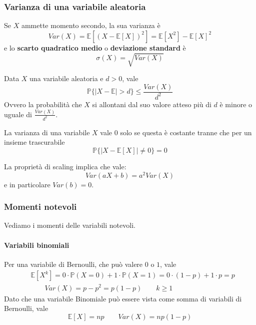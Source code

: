 \subsubsection{Varianza di una variabile aleatoria}
\begin{definition} [Varianza]
	Se $X$ ammette momento secondo, la sua varianza è
	\begin{equation}
		Var(X) = \mathbb{E}[(X-\mathbb{E}[X])^2] = \mathbb{E}[X^2]-\mathbb{E}[X]^2
	\end{equation}
	e lo \textbf{scarto quadratico medio} o \textbf{deviazione standard} è
	\begin{equation}
		\sigma(X) = \sqrt{Var(X)}
	\end{equation}
\end{definition}

\begin{proposition}
	Data $X$ una variabile aleatoria e $d>0$, vale
	\begin{equation}
		\mathbb{P}\{\lvert X - \mathbb{E}\rvert > d\} \leq \frac{Var(X)}{d^2}
	\end{equation}
	Ovvero la probabilità che $X$ si allontani dal suo valore atteso più di $d$ è minore o uguale di $\frac{Var(X)}{d^2}$.
\end{proposition}

\begin{observation}
	La varianza di una variabile $X$ vale $0$ solo se questa è costante tranne che per un insieme trascurabile
	\begin{equation*}
		\mathbb{P}\{\lvert X - \mathbb{E}[X] \rvert \neq 0\} = 0
	\end{equation*}
\end{observation}

\begin{proposition}[Scaling]
	La proprietà di scaling implica che vale:
	\begin{equation}
		Var(a X+b) = a^2 Var(X)
	\end{equation}
	e in particolare $Var(b)=0$.
\end{proposition}

\subsubsection{Momenti notevoli}
Vediamo i momenti delle variabili notevoli.
\paragraph{Variabili binomiali}
Per una variabile di Bernoulli, che può valere $0$ o $1$, vale
\begin{align}
	& \mathbb{E}[X^k] = 0 \cdot \mathbb{P}(X=0)+1\cdot \mathbb{P}(X=1) = 0 \cdot (1-p) + 1 \cdot p = p \\
	&\quad\quad Var(X)=p-p^2=p(1-p) \quad\quad k \geq 1
\end{align}
Dato che una variabile Binomiale può essere vista come somma di variabili di Bernoulli, vale
\begin{equation}
	\mathbb{E}[X] = np \quad\quad Var(X) = np(1-p)
\end{equation}

